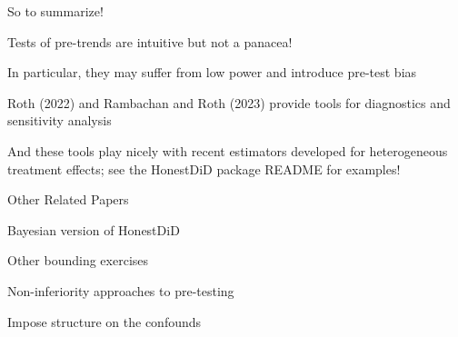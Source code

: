 \documentclass[aspectratio = 169, 13pt]{beamer}
\begin{document}
\begin{frame}{So to summarize!}
	\begin{wideitemize}
		\item
		Tests of pre-trends are intuitive but not a panacea!
		
		\item
		In particular, they may suffer from low power and introduce pre-test bias
		
		\item
		Roth (2022) and Rambachan and Roth (2023) provide tools for diagnostics and sensitivity analysis
		
		\item
		And these tools play nicely with recent estimators developed for heterogeneous treatment effects; see the HonestDiD package README for examples!
		
	\end{wideitemize}
\end{frame}

\begin{frame}[label = relatedpapers]{Other Related Papers}
	
	\begin{wideitemize}
		\item
		Bayesian version of HonestDiD \citep{kwon_empirical_2024}
		
		\item
		Other bounding exercises \citep{manski_how_2017, ye_negative_2021} 
		
		\item
		Non-inferiority approaches to pre-testing \citep{bilinski_seeking_2018, dette_difference--differences_2020}
		
		\item
		Impose structure on the confounds \citep{freyaldenhoven_pre-event_2019}
	\end{wideitemize}
	
\end{frame}


	
		
		
		
\end{document}
